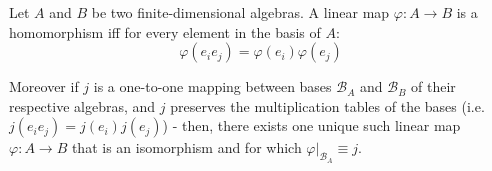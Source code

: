 \begin{theorem}
    Let $A$ and $B$ be two finite-dimensional algebras.
	A linear map $\varphi: A \to B$ is a homomorphism iff for every element in the basis of $A$:
	\[\varphi(e_ie_j) = \varphi(e_i)\varphi(e_j)\]

	Moreover if $j$ is a one-to-one mapping between bases $\mathcal{B}_A$ and $\mathcal{B}_B$ of their respective algebras, and $j$ preserves the multiplication tables of the bases (i.e. $j(e_ie_j) = j(e_i)j(e_j)$) - then, there exists one unique such linear map $\varphi: A \to B$ that is an isomorphism and for which $\varphi|_{\mathcal{B}_A} \equiv j$.
\end{theorem}
